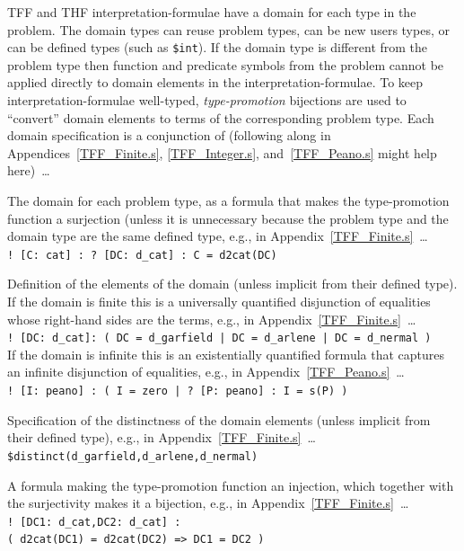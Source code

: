 \documentclass{easychair}
\newcommand{\smalltt}[1]{\small \texttt{#1}}
\newenvironment{packed_itemize}{
\vspace*{-0.3em}
\begin{itemize}
\setlength{\partopsep}{0pt}
\setlength{\itemsep}{1pt}
\setlength{\parskip}{0pt}
\setlength{\parsep}{0pt}
}{\end{itemize}}
\begin{document}
TFF and THF interpretation-formulae have a domain for each type in the problem.
The domain types can reuse problem types, can be new users types, or can be defined types
(such as {\tt \$int}).
If the domain type is different from the problem type then function and predicate symbols from 
the problem cannot be applied directly to domain elements in the interpretation-formulae.
To keep interpretation-formulae well-typed, {\em type-promotion} bijections are used to ``convert'' 
domain elements to terms of the corresponding problem type.
Each domain specification is a conjunction of (following along in Appendices~\ref{TFF_Finite.s}, 
\ref{TFF_Integer.s}, and~\ref{TFF_Peano.s} might help here)~\ldots
\begin{packed_itemize}
\item The domain for each problem type, as a formula that makes the type-promotion function a 
      surjection (unless it is unnecessary because the problem type and the domain type are the
      same defined type, e.g., in Appendix~\ref{TFF_Finite.s}~\ldots\\
      \hspace*{0.5cm}\smalltt{! [C: cat] : ? [DC: d\_cat] : C = d2cat(DC)}
\item Definition of the elements of the domain (unless implicit from their defined type).
      If the domain is finite this is a universally quantified disjunction of equalities whose 
      right-hand sides are the terms, e.g., in Appendix~\ref{TFF_Finite.s}~\ldots\\
      \hspace*{0.5cm}\smalltt{! [DC: d\_cat]: ( DC = d\_garfield | DC = d\_arlene | DC = d\_nermal )}\\
      If the domain is infinite this is an existentially quantified formula that captures an 
      infinite disjunction of equalities, e.g., in Appendix~\ref{TFF_Peano.s}~\ldots\\
      \hspace*{0.5cm}\smalltt{! [I: peano] : ( I = zero | ? [P: peano] : I = s(P) )}
\item Specification of the distinctness of the domain elements (unless implicit from their
      defined type), e.g., in Appendix~\ref{TFF_Finite.s}~\ldots\\
      \hspace*{0.5cm}\smalltt{\$distinct(d\_garfield,d\_arlene,d\_nermal)}
\item A formula making the type-promotion function an injection,
      which together with the surjectivity makes it a bijection, e.g., in 
      Appendix~\ref{TFF_Finite.s}~\ldots\\
      \hspace*{0.5cm}\smalltt{! [DC1: d\_cat,DC2: d\_cat] :}\\
      \hspace*{1.0cm}\smalltt{( d2cat(DC1) = d2cat(DC2) => DC1 = DC2 )}
\end{packed_itemize}
\end{document}
